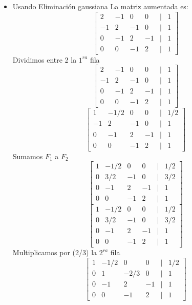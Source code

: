	\begin{itemize}
		\item Usando Eliminación gaussiana
		La matriz aumentada es:
			\[
  			\begin{bmatrix}
   			 2 & -1 & 0 & 0 & | & 1 \\
    		-1 & 2 & -1 & 0 & | & 1\\
    		 0 & -1 & 2 & -1 & | & 1 \\
    		 0 & 0 & -1 & 2 & | & 1 
  			\end{bmatrix}
  			\]
  			Dividimos entre 2 la $1^{ra}$ fila 
  			\[
  			\begin{bmatrix}
   			 2 & -1 & 0 & 0 & | & 1 \\ 
    		-1 & 2 & -1 & 0 & | & 1\\
    		 0 & -1 & 2 & -1 & | & 1 \\
    		 0 & 0 & -1 & 2 & | & 1 
  			\end{bmatrix}
  			\]
  			\[
  			\begin{bmatrix}
   			 1 & -1/2 & 0 & 0 & | & 1/2 \\ 
    		-1 & 2 & -1 & 0 & | & 1\\
    		 0 & -1 & 2 & -1 & | & 1 \\
    		 0 & 0 & -1 & 2 & | & 1 
  			\end{bmatrix}
			\]	
  			Sumamos $F_{1}$ a $F_{2}$
			\[
  			\begin{bmatrix}
   			 1 & -1/2 & 0 & 0 & | & 1/2 \\ 
    		 0 & 3/2 & -1 & 0 & | & 3/2\\
    		 0 & -1 & 2 & -1 & | & 1 \\
    		 0 & 0 & -1 & 2 & | & 1 
  			\end{bmatrix}
  			\]
  			\[
  			\begin{bmatrix}
   			 1 & -1/2 & 0 & 0 & | & 1/2 \\ 
    		 0 & 3/2 & -1 & 0 & | & 3/2\\
    		 0 & -1 & 2 & -1 & | & 1 \\
    		 0 & 0 & -1 & 2 & | & 1 
  			\end{bmatrix}
  			\]
  			Multiplicamos por (2/3) la $2^{ra}$ fila 
  			\[
  			\begin{bmatrix}
   			 1 & -1/2 & 0 & 0 & | & 1/2 \\ 
    		 0 & 1 & -2/3 & 0 & | & 1\\
    		 0 & -1 & 2 & -1 & | & 1 \\
    		 0 & 0 & -1 & 2 & | & 1 
  			\end{bmatrix}
\]
\end{itemize}
